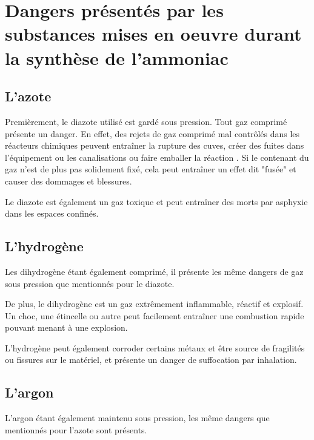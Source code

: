

\section{Dangers présentés par les substances mises en oeuvre durant la synthèse de l'ammoniac}
\subsection{L'azote}
Premièrement, le diazote utilisé est gardé sous pression. Tout gaz comprimé présente un danger. 
En effet, des rejets de gaz comprimé mal contrôlés dans les réacteurs chimiques peuvent entraîner 
la rupture des cuves, créer des fuites dans l'équipement ou les canalisations ou faire emballer la réaction \cite{canada}.
Si le contenant du gaz n'est de plus pas solidement fixé, cela peut entraîner un effet dit "fusée" 
et causer des dommages et blessures.

Le diazote est également un gaz toxique et peut entraîner des morts par asphyxie dans les espaces confinés. 

\subsection{L'hydrogène}
Les dihydrogène étant également comprimé, il présente les même dangers de gaz sous 
pression que mentionnés pour le diazote.

De plus, le dihydrogène est un gaz extrêmement inflammable, réactif et explosif. 
Un choc, une étincelle ou autre peut facilement 
entraîner une combustion rapide pouvant menant à une explosion.

L'hydrogène peut également corroder certains métaux et être source de fragilités
ou fissures sur le matériel, et présente un danger de suffocation par inhalation.

\subsection{L'argon}
L'argon étant également maintenu sous pression, les même dangers que mentionnés
pour l'azote sont présents.


